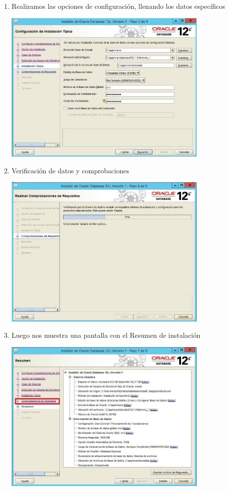 \begin{enumerate}[1.]
	\item Realizamos las opciones de configuraci\'on, llenando los datos espec\'ificos\\
	\begin{center}
	\includegraphics[width=10cm]{./Imagenes/mire1} 
	\end{center}

	\hfill \break
	\hfill \break
	\hfill \break
	\hfill \break
	\hfill \break
	\hfill \break
	\hfill \break
	\hfill \break
	\item Verificaci\'on de datos y comprobaciones\\
	\begin{center}
	\includegraphics[width=10cm]{./Imagenes/mire2} 
	\end{center}

	\item Luego nos muestra una pantalla con el Resumen de instalaci\'on\\
	\begin{center}
	\includegraphics[width=10cm]{./Imagenes/mire3} 
	\end{center}


\end{enumerate}
